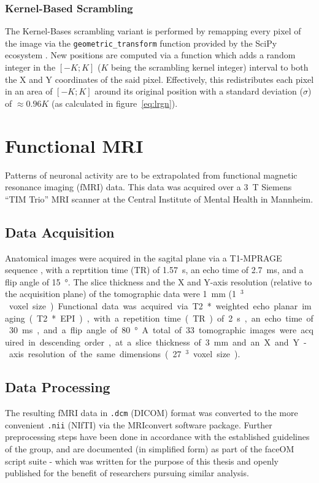	    \subsubsection{Kernel-Based Scrambling}\label{sec:m_vs_si_kbs}
		The Kernel-Bases scrambling variant is performed by remapping every pixel of the image via the \colorbox{vlg}{\texttt{geometric\_transform}} function provided by the SciPy ecosystem \citep{scipy,Oliphant2007}.
		New positions are computed via a function which adds a random integer in the $[-K;K]$ ($K$ being the scrambling kernel integer) interval to both the X and Y coordinates of the said pixel.
		Effectively, this redistributes each pixel in an area of $[-K;K]$ around its original position with a standard deviation ($\sigma$) of $\approx 0.96K$ (as calculated in figure~\ref{eq:lrgn}).
    \section{Functional MRI}\label{sec:m_fmri}
	Patterns of neuronal activity are to be extrapolated from functional magnetic resonance imaging (fMRI) data.
	This data was acquired over a \SI{3}{\tesla} Siemens “TIM Trio” MRI scanner at the Central Institute of Mental Health in Mannheim.
	\subsection{Data Acquisition}
	    Anatomical images were acquired in the sagital plane via a T1-MPRAGE sequence \citep{Brant-Zawadzki1992}, with a reprtition time (TR) of \SI{1.57}{\second}, an echo time of \SI{2.7}{\milli\second}, and a flip angle of \SI{15}{\degree}.
	    The slice thickness and the X and Y-axis resolution (relative to the acquisition plane) of the tomographic data were \SI{1}{\milli\metre} (\SI{1}{\milli\metre$^3$} voxel size).
	    
	    Functional data was acquired via T2* weighted echo planar imaging (T2* EPI), with a repetition time (TR) of \SI{2}{\second}, an echo time of \SI{30}{\milli\second}, and a flip angle of \SI{80}{\degree}.
	    A total of 33 tomographic images were acquired in descending order, at a slice thickness of \SI{3}{\milli\metre} and an X and Y-axis resolution of the same dimensions (\SI{27}{\milli\metre$^3$} voxel size).
	\subsection{Data Processing}
	    The resulting fMRI data in \colorbox{vlg}{\texttt{.dcm}} (DICOM) format was converted to the more convenient \colorbox{vlg}{\texttt{.nii}} (NIfTI) via the MRIconvert \citep{MRIconvert} software package.
	    Further preprocessing steps have been done in accordance with the established guidelines of the group, and are documented (in simplified form) as part of the faceOM script suite \citep{faceOM} - which was written for the purpose of this thesis and openly published for the benefit of researchers pursuing similar analysis.
	    
